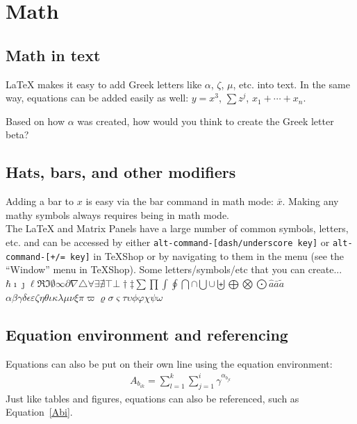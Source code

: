 \documentclass[11pt]{article} %
\begin{document}
\section{Math}
\label{math}

\subsection{Math in text}

LaTeX makes it easy to add Greek letters like $\alpha$, $\zeta$,
$\mu$, etc. into text. In the same way, equations can be added
easily as well: $y=x^3$, $\sum z^j$, $x_1+\cdots+x_n$.

Based on how $\alpha$ was created, how would you think to create the Greek letter beta?

\subsection{Hats, bars, and other modifiers}

Adding a bar to $x$ is easy via the bar command in math mode: $\bar{x}$. Making any mathy symbols always requires being in math mode. \\

The LaTeX and Matrix Panels have a large number of common symbols, letters, etc. and can be accessed by either \texttt{alt-command-[dash/underscore key]} or \texttt{alt-command-[+/= key]} in TeXShop or by navigating to them in the menu (see the ``Window'' menu in TeXShop). Some letters/symbols/etc that you can create... \\

$\hbar\imath\jmath\ell\Re\Im\emptyset\infty\partial\nabla\triangle\forall\exists\nexists\top\bot\dag\ddag\sum\prod\int\oint\bigcap\cap\bigcup\cup\biguplus\bigoplus\bigotimes\bigodot\hat{a}\bar{a}\tilde{a}$ \\

$\alpha\beta\gamma\delta\epsilon\varepsilon\zeta\eta\theta\iota\kappa\lambda\mu\nu\xi\pi\varpi\varrho
\sigma\varsigma\tau\upsilon\phi\varphi\chi\psi\omega$ \\

\subsection{Equation environment and referencing}

Equations can also be put on their own line using the equation environment:
\begin{eqnarray}
A_{b_{ik}} = \sum_{l=1}^{k}\sum_{j=1}^{i} \gamma^{\alpha_{b_{jl}}}
\label{Abi}
\end{eqnarray}
Just like tables and figures, equations can also be referenced, such as Equation~\ref{Abi}. \\
\end{document}
